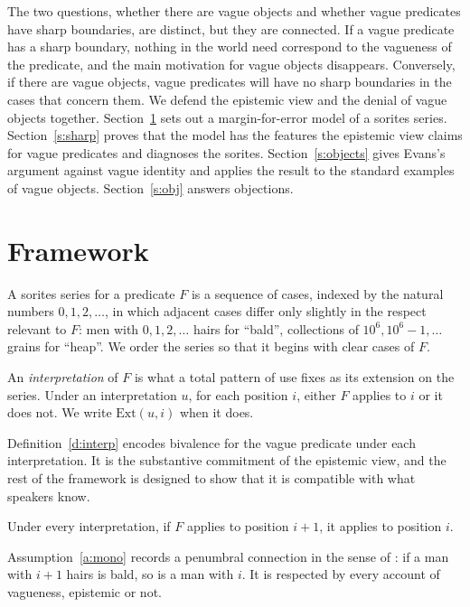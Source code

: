 \documentclass{situationist-preprint}
\begin{document}
The two questions, whether there are vague objects and whether vague predicates have sharp boundaries, are distinct, but they are connected. If a vague predicate has a sharp boundary, nothing in the world need correspond to the vagueness of the predicate, and the main motivation for vague objects disappears. Conversely, if there are vague objects, vague predicates will have no sharp boundaries in the cases that concern them. We defend the epistemic view and the denial of vague objects together. Section~\ref{s:frame} sets out a margin-for-error model of a sorites series. Section~\ref{s:sharp} proves that the model has the features the epistemic view claims for vague predicates and diagnoses the sorites. Section~\ref{s:objects} gives Evans's argument against vague identity and applies the result to the standard examples of vague objects. Section~\ref{s:obj} answers objections.

\section{Framework}\label{s:frame}

A sorites series for a predicate $F$ is a sequence of cases, indexed by the natural numbers $0, 1, 2, \ldots$, in which adjacent cases differ only slightly in the respect relevant to $F$: men with $0, 1, 2, \ldots$ hairs for \enquote{bald}, collections of $10^6, 10^6 - 1, \ldots$ grains for \enquote{heap}. We order the series so that it begins with clear cases of $F$.

\begin{definition}[Interpretations]\label{d:interp}
An \emph{interpretation} of $F$ is what a total pattern of use fixes as its extension on the series. Under an interpretation $u$, for each position $i$, either $F$ applies to $i$ or it does not. We write $\mathrm{Ext}(u,i)$ when it does.
\end{definition}

Definition~\ref{d:interp} encodes bivalence for the vague predicate under each interpretation. It is the substantive commitment of the epistemic view, and the rest of the framework is designed to show that it is compatible with what speakers know.

\begin{assumption}\label{a:mono}
Under every interpretation, if $F$ applies to position $i+1$, it applies to position $i$.
\end{assumption}

Assumption~\ref{a:mono} records a penumbral connection in the sense of \citet{Fine1975}: if a man with $i+1$ hairs is bald, so is a man with $i$. It is respected by every account of vagueness, epistemic or not.
\end{document}
